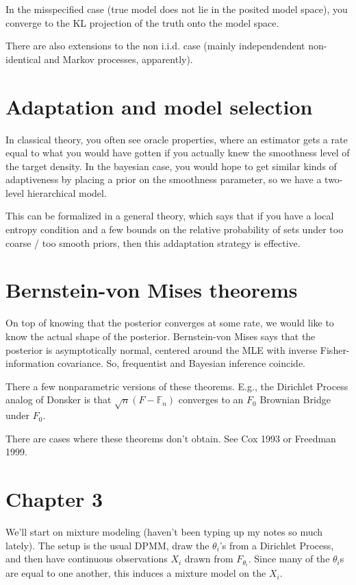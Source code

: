 \documentclass{article}
\begin{document}
In the misspecified case (true model does not lie in the posited model space),
you converge to the KL projection of the truth onto the model space.

There are also extensions to the non i.i.d. case (mainly independendent
non-identical and Markov processes, apparently).

\section{Adaptation and model selection}

In classical theory, you often see oracle properties, where an estimator gets a
rate equal to what you would have gotten if you actually knew the smoothness
level of the target density. In the bayesian case, you would hope to get similar
kinds of adaptiveness by placing a prior on the smoothness parameter, so we have
a two-level hierarchical model.

This can be formalized in a general theory, which says that if you have a local
entropy condition and a few bounds on the relative probability of sets under too
coarse / too smooth priors, then this addaptation strategy is effective.

\section{Bernstein-von Mises theorems}

On top of knowing that the posterior converges at some rate, we would like to
know the actual shape of the posterior. Bernstein-von Mises says that the
posterior is asymptotically normal, centered around the MLE with inverse
Fisher-information covariance. So, frequentist and Bayesian inference coincide.

There a few nonparametric versions of these theorems. E.g., the Dirichlet
Process analog of Donsker is that $\sqrt{n}\left(F - \mathbb{F}_{n}\right)$
converges to an $F_{0}$ Brownian Bridge under $F_{0}$.

There are cases where these theorems don't obtain. See Cox 1993 or Freedman
1999.

\section{Chapter 3}
\label{sec:chapter_3}

We'll start on mixture modeling (haven't been typing up my notes so much
lately). The setup is the usual DPMM, draw the $\theta_{i}$'s from a Dirichlet
Process, and then have continuous observations $X_{i}$ drawn from
$F_{\theta_{i}}$. Since many of the $\theta_{i}$s are equal to one another, this
induces a mixture model on the $X_{i}$.
\end{document}
